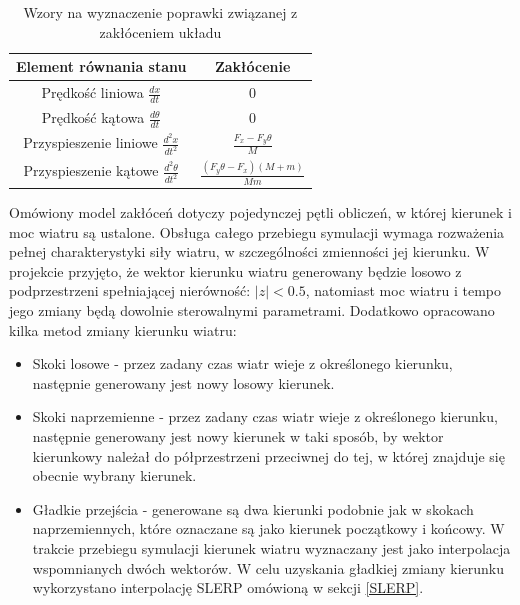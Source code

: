 \documentclass[12pt, oneside]{report}
\theoremstyle{definition}
\begin{document}
\begin{table}[H]
\begin{center}
\begin{tabular}{|c|c|}
  \hline 
  Element równania stanu & Zakłócenie \\
  \hline
  Prędkość liniowa $\frac{dx}{dt}$ & 0 \\
  \hline
  Prędkość kątowa $\frac{d\theta}{dt}$ & 0 \\
  \hline
  Przyspieszenie liniowe $\frac{d^2x}{dt^2}$ & $\frac{F_x - F_y\theta}{M}$ \\
  \hline
  Przyspieszenie kątowe $\frac{d^2\theta}{dt^2}$ & $\frac{(F_y\theta - F_x)(M + m)}{Mm}$ \\
  \hline
\end{tabular} 
\end{center}
\caption{Wzory na wyznaczenie poprawki związanej z zakłóceniem układu}
\label{table:Noises}
\end{table}

Omówiony model zakłóceń dotyczy pojedynczej pętli obliczeń, w której kierunek i moc wiatru są ustalone. Obsługa całego przebiegu symulacji wymaga rozważenia pełnej charakterystyki siły wiatru, w szczególności zmienności jej kierunku. W projekcie przyjęto, że wektor kierunku wiatru generowany będzie losowo z podprzestrzeni spełniającej nierówność: $|z| < 0.5$, natomiast moc wiatru i tempo jego zmiany będą dowolnie sterowalnymi parametrami. Dodatkowo opracowano kilka metod zmiany kierunku wiatru:
\begin{itemize}
\item Skoki losowe - przez zadany czas wiatr wieje z określonego kierunku, następnie generowany jest nowy losowy kierunek.
\item Skoki naprzemienne - przez zadany czas wiatr wieje z określonego kierunku, następnie generowany jest nowy kierunek w taki sposób, by wektor kierunkowy należał do półprzestrzeni przeciwnej do tej, w której znajduje się obecnie wybrany kierunek.
\item Gładkie przejścia - generowane są dwa kierunki podobnie jak w skokach naprzemiennych, które oznaczane są jako kierunek początkowy i końcowy. W trakcie przebiegu symulacji kierunek wiatru wyznaczany jest jako interpolacja wspomnianych dwóch wektorów. W celu uzyskania gładkiej zmiany kierunku wykorzystano interpolację SLERP omówioną w sekcji \ref{SLERP}. 
\end{itemize}
\end{document}
